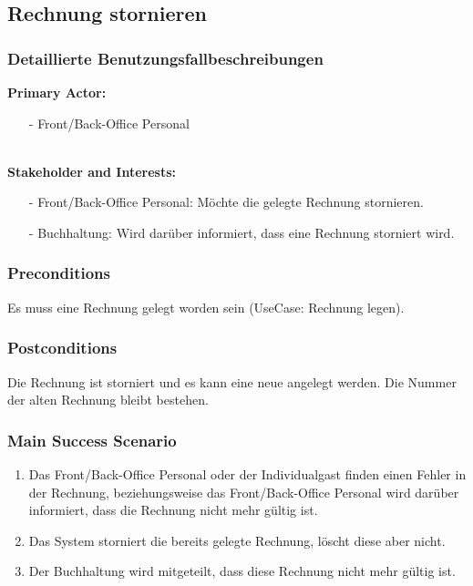 \documentclass[./detailed_overview_usecases.tex]{subfiles}
\begin{document}
    \subsection{Rechnung stornieren}
    \subsubsection{Detaillierte Benutzungsfallbeschreibungen}
    \textbf{Primary Actor: }
    \begin{itemize}
        \item [-] Front/Back-Office Personal
    \end{itemize}
    \\
    \textbf{Stakeholder and Interests:}
    \begin{itemize}
        \item[-] Front/Back-Office Personal: Möchte die gelegte Rechnung stornieren.
        \item[-] Buchhaltung: Wird darüber informiert, dass eine Rechnung storniert wird.
    \end{itemize}

    \subsubsection*{Preconditions}
    Es muss eine Rechnung gelegt worden sein (UseCase: Rechnung legen).

    \subsubsection*{Postconditions}
    Die Rechnung ist storniert und es kann eine neue angelegt werden. Die Nummer der alten Rechnung bleibt bestehen.

    \subsubsection*{Main Success Scenario}
    \begin{enumerate}
        \item Das Front/Back-Office Personal oder der Individualgast finden einen Fehler in der Rechnung, beziehungsweise das Front/Back-Office Personal wird darüber informiert, dass die Rechnung nicht mehr gültig ist.
        \item Das System storniert die bereits gelegte Rechnung, löscht diese aber nicht.
        \item Der Buchhaltung wird mitgeteilt, dass diese Rechnung nicht mehr gültig ist.
    \end{enumerate}
\end{document}
